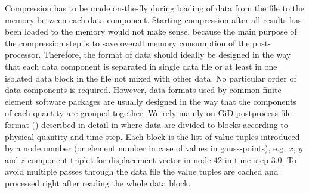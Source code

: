 Compression has to be made on-the-fly during loading of data from the file to the memory between each data component. Starting compression after all results has been loaded to the memory would not make sense, because the main purpose of the compression step is to save overall memory consumption of the post-processor. Therefore, the format of data should ideally be designed in the way that each data component is separated in single data file or at least in one isolated data block in the file not mixed with other data. No particular order of data components is required. However, data formats used by common finite element software packages are usually designed in the way that the components of each quantity are grouped together. We rely mainly on GiD postprocess file format () described in detail in \cite{GiDPostProcess} where data are divided to blocks according to physical quantity and time step. Each block is the list of value tuples introduced by a node number (or element number in case of values in gauss-points), e.g. $x$, $y$ and $z$ component triplet for displacement vector in node $42$ in time step $3.0$. To avoid multiple passes through the data file the value tuples are cached and processed right after reading the whole data block.

